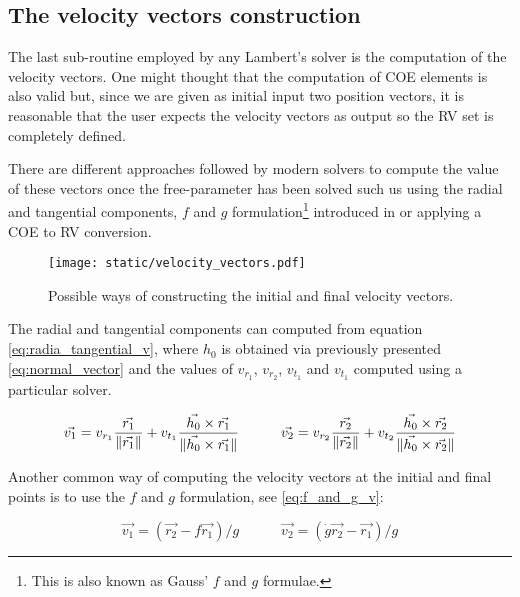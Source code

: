\subsection{The velocity vectors construction}

The last sub-routine employed by any Lambert's solver is the computation of the
velocity vectors. One might thought that the computation of COE elements is also
valid but, since we are given as initial input two position vectors, it is
reasonable that the user expects the velocity vectors as output so the RV set is
completely defined.

There are different approaches followed by modern solvers to compute the value
of these vectors once the free-parameter has been solved such us using the
radial and tangential components, $f$ and $g$ formulation\footnote{This is also
  known as Gauss' $f$ and $g$ formulae.} introduced in \cite{bate1971} or applying a
COE to RV conversion.

\vspace{0.5cm}
\begin{figure}[h]
  \centering
  \texttt{[image: static/velocity\_vectors.pdf]}
  \caption{Possible ways of constructing the initial and final velocity vectors.}
  \label{fig:velocity_vectors}
\end{figure}

The radial and tangential components can computed from equation
\ref{eq:radia_tangential_v}, where $h_0$ is obtained via previously presented
\ref{eq:normal_vector} and the values of $v_{r_1}$, $v_{r_2}$, $v_{t_1}$ and
$v_{t_1}$ computed using a particular solver.

\begin{equation}
  \vec{v_{1}} = v_{r_1} \frac{\vec{r_1}}{\lVert\vec{r_1}\rVert} + v_{t_1} \frac{\vec{h_0} \times \vec{r_1}}{\lVert\vec{h_0} \times \vec{r_1}\rVert}\quad\quad\quad
  \vec{v_{2}} = v_{r_2} \frac{\vec{r_2}}{\lVert\vec{r_2}\rVert} + v_{t_2} \frac{\vec{h_0} \times \vec{r_2}}{\lVert\vec{h_0} \times \vec{r_2}\rVert}
  \label{eq:radia_tangential_v}
\end{equation}

Another common way of computing the velocity vectors at the initial and final
points is to use the $f$ and $g$ formulation, see \ref{eq:f_and_g_v}:

\begin{equation}
  \vec{v_1} = (\vec{r_2} - f \vec{r_1}) / g \quad\quad\quad
  \vec{v_2} = (\dot{g} \vec{r_2} - \vec{r_1}) / g
  \label{eq:f_and_g_v}
\end{equation}


